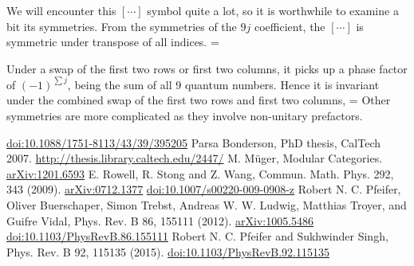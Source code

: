 \documentclass[12pt]{article}
\newcommand{\doi}[1]{\href{https://dx.doi.org/#1}{doi:#1}}
\newcommand{\arxiv}[1]{\href{https://arxiv.org/abs/#1}{arXiv:#1}}
\begin{document}
We will encounter this $[\cdots]$ symbol quite a lot, so it is worthwhile to examine a bit its symmetries.
From the symmetries of the $9j$ coefficient, the $[\cdots]$ is symmetric under transpose of all indices.
\beq
{}
=
\eeq

Under a swap of the first two rows or first two columns, it picks up a phase factor of $(-1)^{\sum j}$,
being the sum of all 9 quantum numbers. Hence it is invariant under the combined swap of the first two
rows and first two columns,
\beq
{}
=
\eeq
Other symmetries are more complicated as they involve non-unitary prefactors.

\fi

\begin{thebibliography}{99}
 \doi{10.1088/1751-8113/43/39/395205}
 Parsa Bonderson, PhD thesis, CalTech 2007.  \url{http://thesis.library.caltech.edu/2447/}
 M. M\"uger, Modular Categories. \arxiv{1201.6593}
 E. Rowell, R. Stong and Z. Wang, Commun. Math. Phys. 292, 343 (2009).
\arxiv{0712.1377}
\doi{10.1007/s00220-009-0908-z}
 Robert N. C. Pfeifer, Oliver Buerschaper, Simon Trebst, Andreas W. W. Ludwig, 
Matthias Troyer, and Guifre Vidal, Phys. Rev. B 86, 155111 (2012).
\arxiv{1005.5486}
\doi{10.1103/PhysRevB.86.155111}
 Robert N. C. Pfeifer and Sukhwinder Singh, Phys. Rev. B 92, 115135 (2015).
\doi{10.1103/PhysRevB.92.115135}

\end{thebibliography}
\end{document}
